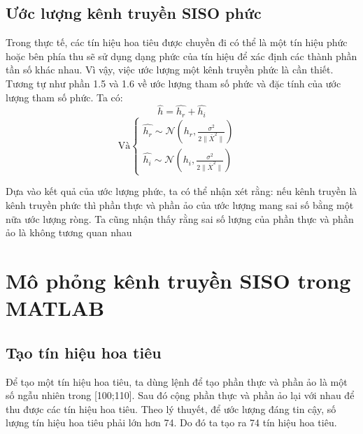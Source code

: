 \documentclass{article}
\begin{document}
\subsection{Ước lượng kênh truyền SISO phức}
Trong thực tế, các tín hiệu hoa tiêu được chuyền đi có thể là một tín hiệu phức hoặc bên phía thu sẽ sử dụng dạng phức của tín hiệu để xác định các thành phần tần số khác nhau. Vì vậy, việc ước lượng một kênh truyền phức là cần thiết. Tương tự như phần 1.5 và 1.6 về ước lượng tham số phức và đặc tính của ước lượng tham số phức. Ta có:
$$\hat{h} = \hat{h_r} + \hat{h_i}$$
$$ \text{Và} \begin{cases}
    \hat{h_r} \sim \mathcal{N}(h_r,\frac{\sigma^2}{2 \| \overline{X}^2 \|}) &\\
    \hat{h_i} \sim \mathcal{N}(h_i,\frac{\sigma^2}{2 \| \overline{X}^2 \|}) &
\end{cases}$$

Dựa vào kết quả của ước lượng phức, ta có thể nhận xét rằng: nếu kênh truyền là kênh truyền phức thì phần thực và phần ảo của ước lượng mang sai số bằng một nữa ước lượng ròng. Ta cũng nhận thấy rằng sai số lượng của phần thực và phần ảo là không tương quan nhau

\section{Mô phỏng kênh truyền SISO trong MATLAB}
\subsection{Tạo tín hiệu hoa tiêu}
Để tạo một tín hiệu hoa tiêu, ta dùng lệnh để tạo phần thực và phần ảo là một số ngẫu nhiên trong [100;110]. Sau đó cộng phần thực và phần ảo lại với nhau để thu được các tín hiệu hoa tiêu. Theo lý thuyết, để ước lượng đáng tin cậy, số lượng tín hiệu hoa tiêu phải lớn hơn 74. Do đó ta tạo ra 74 tín hiệu hoa tiêu.
\end{document}
